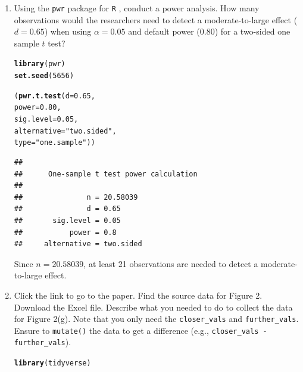 \documentclass{article}\usepackage[]{graphicx}\usepackage[]{xcolor}
\makeatletter
\newcommand{\hlnum}[1]{\textcolor[rgb]{0.686,0.059,0.569}{#1}}%
\newcommand{\hlsng}[1]{\textcolor[rgb]{0.192,0.494,0.8}{#1}}%
\newcommand{\hldef}[1]{\textcolor[rgb]{0.345,0.345,0.345}{#1}}%
\newcommand{\hlkwc}[1]{\textcolor[rgb]{0.333,0.667,0.333}{#1}}%
\newcommand{\hlkwd}[1]{\textcolor[rgb]{0.737,0.353,0.396}{\textbf{#1}}}%
\newenvironment{kframe}{%
 \def\at@end@of@kframe{}%
 \ifinner\ifhmode%
  \def\at@end@of@kframe{\end{minipage}}%
  \begin{minipage}{\columnwidth}%
 \fi\fi%
 \def\FrameCommand##1{\hskip\@totalleftmargin \hskip-\fboxsep
 \colorbox{shadecolor}{##1}\hskip-\fboxsep
     \hskip-\linewidth \hskip-\@totalleftmargin \hskip\columnwidth}%
 \MakeFramed {\advance\hsize-\width
   \@totalleftmargin\z@ \linewidth\hsize
   \@setminipage}}%
 {\par\unskip\endMakeFramed%
 \at@end@of@kframe}
\newenvironment{knitrout}{}{} %
\makeatother
\begin{document}
\begin{enumerate}
\item Using the \texttt{pwr} package for \texttt{R} \citep{pwr},
conduct a power analysis. How many observations would the researchers 
need to detect a moderate-to-large effect ($d=0.65$) when using 
$\alpha=0.05$ and default power (0.80) for a two-sided one sample 
$t$ test?

\begin{knitrout}\scriptsize
{}\color{fgcolor}\begin{kframe}
\begin{alltt}
\hlkwd{library}\hldef{(pwr)}
\hlkwd{set.seed}\hldef{(}\hlnum{5656}\hldef{)}

\hldef{(}\hlkwd{pwr.t.test}\hldef{(}\hlkwc{d} \hldef{=} \hlnum{0.65}\hldef{,}
           \hlkwc{power} \hldef{=} \hlnum{0.80}\hldef{,}
           \hlkwc{sig.level} \hldef{=} \hlnum{0.05}\hldef{,}
           \hlkwc{alternative} \hldef{=} \hlsng{"two.sided"}\hldef{,}
           \hlkwc{type} \hldef{=} \hlsng{"one.sample"}\hldef{))}
\end{alltt}
\begin{verbatim}
## 
##      One-sample t test power calculation 
## 
##               n = 20.58039
##               d = 0.65
##       sig.level = 0.05
##           power = 0.8
##     alternative = two.sided
\end{verbatim}
\end{kframe}
\end{knitrout}

Since $n = 20.58039$, at least 21 observations are needed to detect a moderate-to-large effect.

\item Click the link to go to the paper. Find the source data for 
Figure 2. Download the Excel file. Describe what you needed to
do to collect the data for Figure 2(g). Note that you only need the 
\texttt{closer\_vals} and \texttt{further\_vals}. Ensure to 
\texttt{mutate()} the data to get a difference 
(e.g., \texttt{closer\_vals - further\_vals}).

\begin{knitrout}\scriptsize
{}\color{fgcolor}\begin{kframe}
\begin{alltt}
\hlkwd{library}\hldef{(tidyverse)}


\end{alltt}
\end{kframe}
\end{knitrout}
\end{enumerate}
\end{document}
